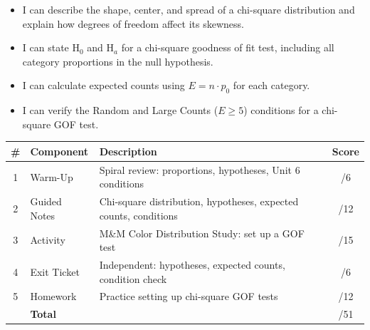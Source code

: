 \documentclass[10pt]{article}
\begin{document}

\vspace{2.4cm}
\namedateperiod

\begin{learningtargetbox}
\begin{itemize}
    \item I can describe the shape, center, and spread of a chi-square distribution
          and explain how degrees of freedom affect its skewness.
    \item I can state H$_0$ and H$_a$ for a chi-square goodness of fit test, including
          all category proportions in the null hypothesis.
    \item I can calculate expected counts using $E = n \cdot p_0$ for each category.
    \item I can verify the Random and Large Counts ($E \ge 5$) conditions for a
          chi-square GOF test.
\end{itemize}
\end{learningtargetbox}

\begin{tocbox}
\renewcommand{\arraystretch}{1.5}
\begin{tabularx}{\linewidth}{clXc}
    \textbf{\#} & \textbf{Component} & \textbf{Description} & \textbf{Score} \\
    \hline
    1 & Warm-Up      & Spiral review: proportions, hypotheses, Unit 6 conditions & \hfill/6 \\
    2 & Guided Notes & Chi-square distribution, hypotheses, expected counts, conditions & \hfill/12 \\
    3 & Activity     & M\&M Color Distribution Study: set up a GOF test & \hfill/15 \\
    4 & Exit Ticket  & Independent: hypotheses, expected counts, condition check & \hfill/6 \\
    5 & Homework     & Practice setting up chi-square GOF tests & \hfill/12 \\
    \hline
       & \multicolumn{2}{l}{\textbf{Total}} & \hfill/51 \\
\end{tabularx}
\end{tocbox}
\end{document}

